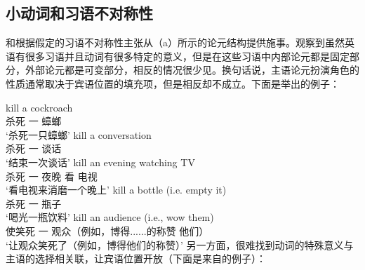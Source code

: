 \subsection{小动词和习语不对称性}
\label{idiom-asym}

\mbox{}\citet{Marantz84a}和\citet{Kratzer96a}根据假定的习语不对称性主张从（a）所示的论元结构提供施事。\citet{Marantz84a}观察到虽然英语有很多习语并且动词有很多特定的意义，但是在这些习语中内部论元都是固定部分，外部论元都是可变部分，相反的情况很少见。换句话说，主语论元扮演角色的性质通常取决于宾语位置的填充项，但是相反却不成立。下面是\citep[]{Kratzer96a}举出的例子：

\eal
\ex 
\gll kill a cockroach\\
     杀死 一 蟑螂\\
\glt `杀死一只蟑螂'
\ex 
\gll kill a conversation\\
    杀死 一 谈话\\
\glt `结束一次谈话'
\ex 
\gll kill an evening watching TV\\
     杀死 一 夜晚 看 电视\\
\glt `看电视来消磨一个晚上'
\ex 
\gll kill a bottle (i.e. empty it) \\
     杀死 一 瓶子\\
\glt `喝光一瓶饮料'
\ex 
\gll kill an audience (i.e., wow them) \\
     使笑死 一 观众（例如，博得......的称赞 他们）\\
\glt `让观众笑死了（例如，博得他们的称赞）'
\zl
另一方面，很难找到动词的特殊意义与主语的选择相关联，让宾语位置开放（下面是来自的例子）：

